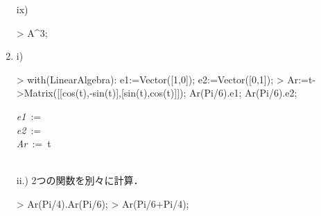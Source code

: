 \begin{enumerate}
ix)
\begin{MapleInput}
> A^3;
\end{MapleInput}
\begin{MapleOutput}
\left[ \begin {array}{cc} 37&54\\ 81&118\end {array} \right] 
\end{MapleOutput}
\item
i)
\begin{MapleInput}
> with(LinearAlgebra): e1:=Vector([1,0]); e2:=Vector([0,1]);
> Ar:=t->Matrix([[cos(t),-sin(t)],[sin(t),cos(t)]]); Ar(Pi/6).e1; Ar(Pi/6).e2;
\end{MapleInput}
\begin{MapleOutputGather}
{\it e1}\, := \, \left[ \begin {array}{c} 1\\ 0\end {array} \right] \notag \\
{\it e2}\, := \, \left[ \begin {array}{c} 0\\ 1\end {array} \right]  \notag \\
{\it Ar}\, := \,t\mapsto  {}  \notag \\
 \notag \\
  \notag
\end{MapleOutputGather}

ii.) 2つの関数を別々に計算．
\begin{MapleInput}
> Ar(Pi/4).Ar(Pi/6); 
> Ar(Pi/6+Pi/4);
\end{MapleInput}
\begin{MapleOutputGather}
 \notag \\
 \notag
\end{MapleOutputGather}


\end{enumerate}
